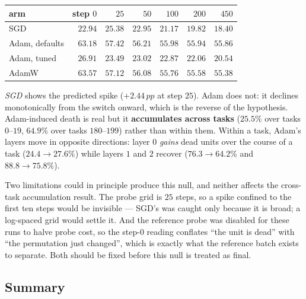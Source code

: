\documentclass[10pt]{article}
\newcommand{\pp}{\,pp}
\begin{document}
\begin{center}
\small
\begin{tabular}{@{}l r r r r r r@{}}
\toprule
arm & step $0$ & $25$ & $50$ & $100$ & $200$ & $450$ \\
\midrule
SGD & $22.94$ & $\mathbf{25.38}$ & $22.95$ & $21.17$ & $19.82$ & $18.40$ \\
Adam, defaults & $63.18$ & $57.42$ & $56.21$ & $55.98$ & $55.94$ & $55.86$ \\
Adam, tuned & $26.91$ & $23.49$ & $23.02$ & $22.87$ & $22.06$ & $20.54$ \\
AdamW & $63.57$ & $57.12$ & $56.08$ & $55.76$ & $55.58$ & $55.38$ \\
\bottomrule
\end{tabular}
\end{center}

\emph{SGD} shows the predicted spike ($+2.44\pp$ at step $25$). Adam does not:
it declines monotonically from the switch onward, which is the reverse of the
hypothesis. Adam-induced death is real but it \textbf{accumulates across tasks}
($25.5\%$ over tasks $0$--$19$, $64.9\%$ over tasks $180$--$199$) rather than
within them. Within a task, Adam's layers move in opposite directions: layer $0$
\emph{gains} dead units over the course of a task ($24.4 \to 27.6\%$) while
layers $1$ and $2$ recover ($76.3 \to 64.2\%$ and $88.8 \to 75.8\%$).

Two limitations could in principle produce this null, and neither affects the
cross-task accumulation result. The probe grid is $25$ steps, so a spike confined
to the first ten steps would be invisible --- SGD's was caught only because it is
broad; a log-spaced grid would settle it. And the reference probe was disabled
for these runs to halve probe cost, so the step-$0$ reading conflates ``the unit
is dead'' with ``the permutation just changed'', which is exactly what the
reference batch exists to separate. Both should be fixed before this null is
treated as final.

\subsection{Summary}
\end{document}
